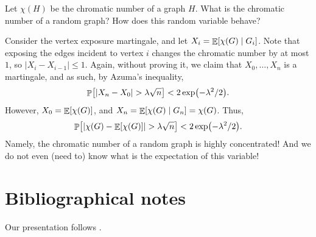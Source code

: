 \begin{example}
    Let $\chi(H)$ be the chromatic number of a graph
    $H$. What is the chromatic number of a random graph? How
    does this random variable behave?

    Consider the vertex exposure martingale, and let $X_i =
    \mathop{\mathbb{E}}\!\left[ \chi(G) \;\middle\vert\; G_i \right]$. Note that exposing the edges incident to vertex $i$
    changes the chromatic number by at most $1$, so $|X_i - X_{i-1}| \leq 1$.
    Again, without proving it, we claim
    that $X_0, \ldots, X_n$ is a martingale, and as such, by Azuma's inequality,
    \begin{equation*}
        \Prob{\cardin{X_n - X_0} > \lambda \sqrt{n}} <
        2\exp\pth{-\lambda^2/2}.
    \end{equation*}
    However, $X_0 = \mathop{\mathbb{E}}\!\left[ { \chi(G) } \right]$, and $X_n =
    \mathop{\mathbb{E}}\!\left[ \chi(G) \;\middle\vert\; G_n \right] = \chi(G)$.  Thus,
    \begin{align*}
    \Prob{\cardin{\chi(G) - \Ex{\chi(G)}} > \lambda \sqrt{n}} <
    2\exp\pth{-\lambda^2/2}.
    \end{align*}
    Namely, the chromatic number of a random graph is highly
    concentrated! And we do not even (need to) know what is the
    expectation of this variable!
\end{example}







\section{Bibliographical notes}

Our presentation follows \cite{mr-ra-95}.




\ChapterEnd{}

